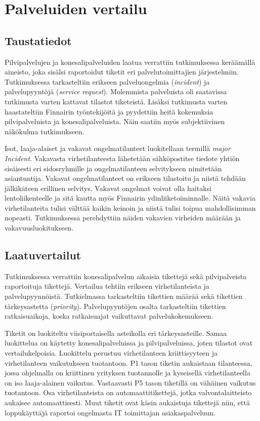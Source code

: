 \chapter{Palveluiden vertailu\label{vertailu}}

\section{Taustatiedot}
Pilvipalvelujen ja konesalipalveluiden laatua verrattiin tutkimuksessa keräämällä aineisto, joka sisälsi raportoidut tiketit eri palvelutoimittajien järjestelmiin. Tutkimuksessa tarkasteltiin erikseen palveluongelmia (\emph{incident}) ja palvelupyyntöjä (\emph{service request}). Molemmista palveluista oli saatavissa tutkimusta varten kattavat tilastot tiketeistä. Lisäksi tutkimusta varten haastateltiin Finnairin työntekijöitä ja pyydettiin heitä kokemuksia pilvipalveluista ja konesalipalveluista. Näin saatiin myös subjektiivinen näkökulma tutkimukseen.

Isot, laaja-alaiset ja vakavat ongelmatilanteet luokitellaan termillä \emph{major Incident}. Vakavasta virhetilanteesta lähetetään sähköpostitse tiedote yhtiön sisäisesti eri sidosryhmille ja ongelmatilanteen selvitykseen nimitetään asiantuntija. Vakavat ongelmatilanteet on erikseen tilastoitu ja niistä tehdään jälkikäteen erillinen selvitys. Vakavat ongelmat voivat olla haitaksi lentoliikenteelle ja sitä kautta myös Finnairin ydinliiketoiminnalle. Näitä vakavia virhetilanteita tulisi välttää kaikin keinoin ja niistä tulisi toipua mahdollisimman nopeasti. Tutkimuksessa perehdyttiin näiden vakavien virheiden määrään ja vakavuusluokitukseen.

\section{Laatuvertailut}
Tutkimuksessa verrattiin konesalipalvelun aikaisia tikettejä sekä pilvipalveista raportoituja tikettejä. Vertailua tehtiin erikseen virhetilanteista ja palvelupyynnöistä. Tutkielmassa tarkasteltiin tikettien määrää sekä tikettien tärkeysastetta (\emph{priority}). Palvelupyyntöjen osalta tarkasteltiin tikettien ratkaisuaikoja, koska ratkaisuajat vaikuttavat palvelukokemukseen.

Tiketit on luokiteltu viisiportaisella asteikolla eri tärkeysasteille. Samaa luokittelua on käytetty konesalipalveluissa ja pilvipalveluissa, joten tilastot ovat vertailukelpoisia. Luokittelu perustuu virhetilanteen kriittisyyteen ja virhetilanteen vaikutukseen tuotantoon. P1 tason tiketin aukaistaan tilanteessa, jossa ohjelmalla on kriittinen yrityksen tuotannolle ja kyseisellä virhetilanteella on iso laaja-alainen vaikutus. Vastaavasti P5 tason tiketillä on vähäinen vaikutus tuotantoon. Osa virhetilanteista on automaattitikettejä, jotka valvontalaitteisto aukaisee automaattisesti. Muut tiketit ovat käsin aukaistuja tikettejä niin, että loppukäyttäjä raportoi ongelmasta IT toimittajan asiakaspalveluun. 

